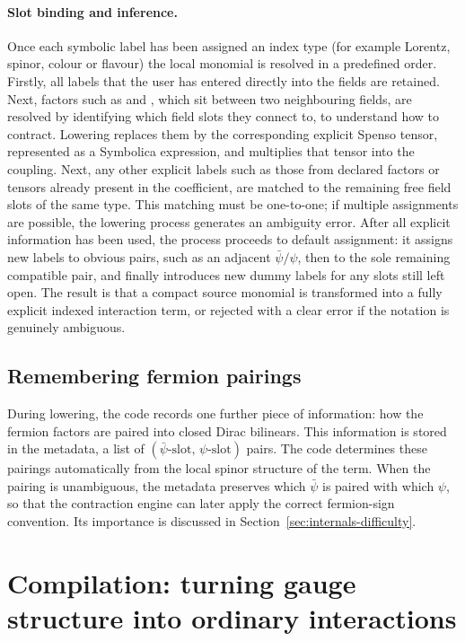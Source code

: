 \paragraph{Slot binding and inference.} Once each symbolic label has been assigned an index type (for example Lorentz, spinor, colour or flavour) the local monomial is resolved in a predefined order. Firstly, all labels that the user has entered directly into the fields are retained. Next, factors such as  and , which sit between two neighbouring fields, are resolved by identifying which field slots they connect to, to understand how to contract. Lowering replaces them by the corresponding explicit Spenso tensor, represented as a Symbolica expression, and multiplies that tensor into the coupling. Next, any other explicit labels such as those from declared factors or tensors already present in the coefficient, are matched to the remaining free field slots of the same type. This matching must be one-to-one; if multiple assignments are possible, the lowering process generates an ambiguity error. After all explicit information has been used, the process proceeds to default assignment: it assigns new labels to obvious pairs, such as an adjacent $\bar\psi/\psi$, then to the sole remaining compatible pair, and finally introduces new dummy labels for any slots still left open. The result is that a compact source monomial is transformed into a fully explicit indexed interaction term, or rejected with a clear error if the notation is genuinely ambiguous.



\subsection{Remembering fermion pairings}

During lowering, the code records one further piece of information: how the fermion factors are paired into closed Dirac bilinears. This information is stored in the  metadata, a list of $(\bar\psi\text{-slot},\,\psi\text{-slot})$ pairs. The code determines these pairings automatically from the local spinor structure of the term. When the pairing is unambiguous, the metadata preserves which \(\bar\psi\) is paired with which \(\psi\), so that the contraction engine can later apply the correct fermion-sign convention. Its importance is discussed in Section~\ref{sec:internals-difficulty}.

\section{Compilation: turning gauge structure into ordinary interactions}
\label{sec:internals-compiler}

